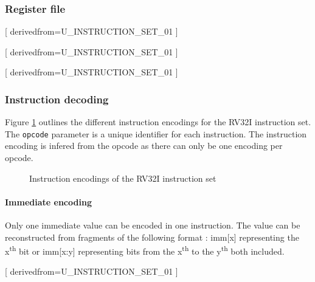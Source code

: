 \subsubsection{Register file}

[
  derivedfrom=U\_INSTRUCTION\_SET\_01
]

[
  derivedfrom=U\_INSTRUCTION\_SET\_01
]

[
  derivedfrom=U\_INSTRUCTION\_SET\_01
]

\subsubsection{Instruction decoding}

\begin{content}
  Figure \ref{fig:instructionencoding} outlines the different instruction encodings for the RV32I instruction set. The \texttt{opcode} parameter is a unique identifier for each instruction. The instruction encoding is infered from the opcode as there can only be one encoding per opcode.
\end{content}

\begin{figure}[h!]
    \centering
    
    \caption{Instruction encodings of the RV32I instruction set}
    \label{fig:instructionencoding}
\end{figure}

\paragraph{Immediate encoding}

\begin{content}
  Only one immediate value can be encoded in one instruction. The value can be reconstructed from fragments of the following format : imm[x] representing the x\textsuperscript{th} bit or imm[x:y] representing bits from the x\textsuperscript{th} to the y\textsuperscript{th} both included.
\end{content}

[
  derivedfrom=U\_INSTRUCTION\_SET\_01
]

